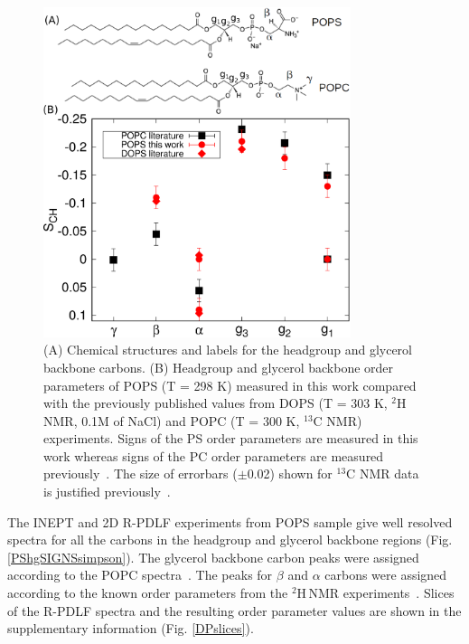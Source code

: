 \documentclass[aps,prl,superscriptaddress,twocolumn]{revtex4}
\begin{document}
\begin{figure}[!htb]
  \centering
  \includegraphics[width=9.0cm]{../Figs/PCPScomp.eps}
  \caption{\label{HGorderParameters}
    (A) Chemical structures and labels for the headgroup and glycerol backbone carbons.
    (B) Headgroup and glycerol backbone order parameters of POPS (T = 298 K) measured in this work compared
    with the previously published values from DOPS (T = 303 K, $^2$H NMR, 0.1M of NaCl) \cite{browning80} and 
    POPC  (T = 300 K, $^{13}$C NMR) \cite{ferreira13} experiments. Signs of the PS order parameters
    are measured in this work whereas signs of the PC order parameters are measured previously~\cite{ferreira16}.
    The size of errorbars ($\pm$0.02) shown for $^{13}$C NMR data is justified previously~\cite{botan15,ollila16}. 
  }
\end{figure}

The INEPT and 2D R-PDLF experiments from POPS sample give well resolved spectra for all the
carbons in the headgroup and glycerol backbone regions (Fig. \ref{PShgSIGNSsimpson}).
The glycerol backbone carbon peaks were assigned according to the POPC spectra~\cite{ferreira13}.
The peaks for $\beta$ and $\alpha$ carbons were assigned according to the
known order parameters from the $^2$H\,NMR experiments~\cite{browning80}.
Slices of the R-PDLF spectra and the resulting order parameter values
are shown in the supplementary information (Fig. \ref{DPslices}). 
\end{document}
